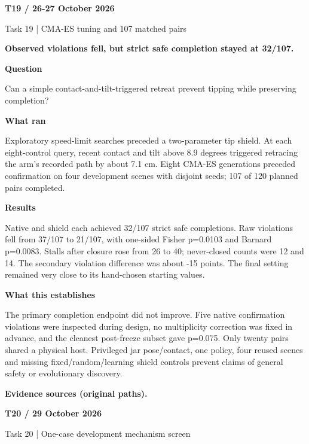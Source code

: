 \documentclass[11pt,a4paper]{article}
\newcommand{\block}[2]{\par\textbf{\color{ink}#1}\par\nopagebreak #2\par}
\newcommand{\finding}[1]{\begin{tcolorbox}[colback=pale,colframe=pale,boxrule=0pt,arc=1mm,left=10pt,right=10pt,top=10pt,bottom=10pt]\color{ink}\large\bfseries #1\end{tcolorbox}}
\begin{document}
\clearpage
{}\label{exp:T19}
{\color{accent}\small\bfseries T19 / 26-27 October 2026}\par
{}\par
{\color{muted}\small Task 19 | CMA-ES tuning and 107 matched pairs}\par\vspace{2mm}
\finding{Observed violations fell, but strict safe completion stayed at 32/107.}
\block{Question}{Can a simple contact-and-tilt-triggered retreat prevent tipping while preserving completion?}
\block{What ran}{Exploratory speed-limit searches preceded a two-parameter tip shield. At each eight-control query, recent contact and tilt above 8.9 degrees triggered retracing the arm's recorded path by about 7.1 cm. Eight CMA-ES generations preceded confirmation on four development scenes with disjoint seeds; 107 of 120 planned pairs completed.}
\block{Results}{Native and shield each achieved 32/107 strict safe completions. Raw violations fell from 37/107 to 21/107, with one-sided Fisher p=0.0103 and Barnard p=0.0083. Stalls after closure rose from 26 to 40; never-closed counts were 12 and 14. The secondary violation difference was about -15 points. The final setting remained very close to its hand-chosen starting values.}
\block{What this establishes}{The primary completion endpoint did not improve. Five native confirmation violations were inspected during design, no multiplicity correction was fixed in advance, and the cleanest post-freeze subset gave p=0.075. Only twenty pairs shared a physical host. Privileged jar pose/contact, one policy, four reused scenes and missing fixed/random/learning shield controls prevent claims of general safety or evolutionary discovery.}
\vfill{\footnotesize\color{muted}\textbf{Evidence sources (original paths).}\par
\raggedright {}\par {}}
\clearpage
{}\label{exp:T20}
{\color{accent}\small\bfseries T20 / 29 October 2026}\par
{}\par
{\color{muted}\small Task 20 | One-case development mechanism screen}\par\vspace{2mm}
\end{document}
